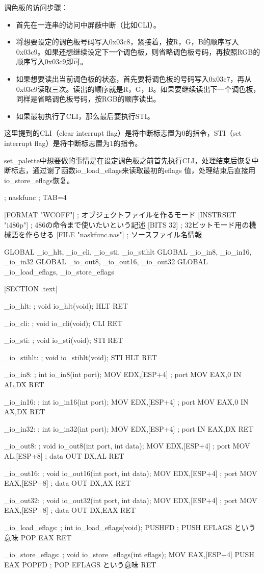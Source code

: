 调色板的访问步骤：
\begin{itemize}
  \item 首先在一连串的访问中屏蔽中断（比如CLI）。
  \item 将想要设定的调色板号码写入0x03c8，紧接着，按R，G，B的顺序写入0x03c9。如果还想继续设定下一个调色板，则省略调色板号码，再按照RGB的顺序写入0x03c9即可。
  \item 如果想要读出当前调色板的状态，首先要将调色板的号码写入0x03c7，再从0x03c9读取三次。读出的顺序就是R，G，B。如果要继续读出下一个调色板，同样是省略调色板号码，按RGB的顺序读出。
  \item 如果最初执行了CLI，那么最后要执行STI。
\end{itemize}

这里提到的CLI（clear interrupt flag）是将中断标志置为0的指令，STI（set interrupt flag）是将中断标志置为1的指令。

set\_palette中想要做的事情是在设定调色板之前首先执行CLI，处理结束后恢复中断标志，通过谢了函数io\_load\_eflags来读取最初的eflags 值，处理结束后直接用io\_store\_eflags恢复。

\begin{code}[label=naskfunc.nas]
; naskfunc
; TAB=4

[FORMAT "WCOFF"]				; オブジェクトファイルを作るモード	
[INSTRSET "i486p"]				; 486の命令まで使いたいという記述
[BITS 32]						; 32ビットモード用の機械語を作らせる
[FILE "naskfunc.nas"]			; ソースファイル名情報

		GLOBAL	_io_hlt, _io_cli, _io_sti, _io_stihlt
		GLOBAL	_io_in8,  _io_in16,  _io_in32
		GLOBAL	_io_out8, _io_out16, _io_out32
		GLOBAL	_io_load_eflags, _io_store_eflags

[SECTION .text]

_io_hlt:	; void io_hlt(void);
		HLT
		RET

_io_cli:	; void io_cli(void);
		CLI
		RET

_io_sti:	; void io_sti(void);
		STI
		RET

_io_stihlt:	; void io_stihlt(void);
		STI
		HLT
		RET

_io_in8:	; int io_in8(int port);
		MOV		EDX,[ESP+4]		; port
		MOV		EAX,0
		IN		AL,DX
		RET

_io_in16:	; int io_in16(int port);
		MOV		EDX,[ESP+4]		; port
		MOV		EAX,0
		IN		AX,DX
		RET

_io_in32:	; int io_in32(int port);
		MOV		EDX,[ESP+4]		; port
		IN		EAX,DX
		RET

_io_out8:	; void io_out8(int port, int data);
		MOV		EDX,[ESP+4]		; port
		MOV		AL,[ESP+8]		; data
		OUT		DX,AL
		RET

_io_out16:	; void io_out16(int port, int data);
		MOV		EDX,[ESP+4]		; port
		MOV		EAX,[ESP+8]		; data
		OUT		DX,AX
		RET

_io_out32:	; void io_out32(int port, int data);
		MOV		EDX,[ESP+4]		; port
		MOV		EAX,[ESP+8]		; data
		OUT		DX,EAX
		RET

_io_load_eflags:	; int io_load_eflags(void);
		PUSHFD		; PUSH EFLAGS という意味
		POP		EAX
		RET

_io_store_eflags:	; void io_store_eflags(int eflags);
		MOV		EAX,[ESP+4]
		PUSH	EAX
		POPFD		; POP EFLAGS という意味
		RET
\end{code}

